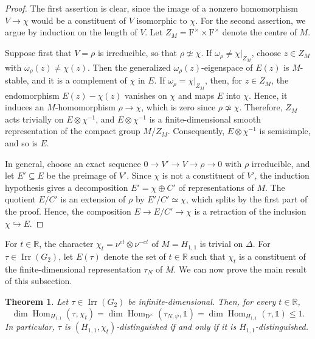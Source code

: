\documentclass[11pt]{amsart}
\numberwithin{equation}{section}
\theoremstyle{plain}
\newtheorem{theorem}{Theorem}[section]
\theoremstyle{definition}
\theoremstyle{remark}
\newcommand{\R}{\mathbb{R}}
\newcommand{\one}{\mathds{1}}
\DeclareMathOperator{\Hom}{Hom}
\DeclareMathOperator{\Irr}{Irr}
\begin{document}
\begin{proof}
	The first assertion is clear, since the image of a nonzero homomorphism $V\to\chi$ would be a constituent of $V$ isomorphic to $\chi$. For the second assertion, we argue by induction on the length of $V$. Let $Z_M=\mathrm{F}^\times\times \mathrm{F}^\times$ denote the centre of $M$.
	
	Suppose first that $V=\rho$ is irreducible, so that $\rho\not\simeq\chi$. If $\omega_\rho\ne\chi|_{Z_M}$, choose $z\in Z_M$ with $\omega_\rho(z)\ne\chi(z)$. Then the generalized $\omega_\rho(z)$-eigenspace of $E(z)$ is $M$-stable, and it is a complement of $\chi$ in $E$. If $\omega_\rho=\chi|_{Z_M}$, then, for $z\in Z_M$, the endomorphism $E(z)-\chi(z)$ vanishes on $\chi$ and maps $E$ into $\chi$. Hence, it induces an $M$-homomorphism $\rho\to\chi$, which is zero since $\rho\not\simeq\chi$. Therefore, $Z_M$ acts trivially on $E\otimes\chi^{-1}$, and $E\otimes\chi^{-1}$ is a finite-dimensional smooth representation of the compact group $M/Z_M$. Consequently, $E\otimes\chi^{-1}$ is semisimple, and so is $E$.
	
	In general, choose an exact sequence $0\to V'\to V\to\rho\to0$ with $\rho$ irreducible, and let $E'\subseteq E$ be the preimage of $V'$. Since $\chi$ is not a constituent of $V'$, the induction hypothesis gives a decomposition $E'=\chi\oplus C'$ of representations of $M$. The quotient $E/C'$ is an extension of $\rho$ by $E'/C'\simeq\chi$, which splits by the first part of the proof. Hence, the composition $E\to E/C'\to\chi$ is a retraction of the inclusion $\chi\hookrightarrow E$.
\end{proof}

For $t\in\R$, the character $\chi_t=\nu^{et}\otimes\nu^{-et}$ of $M=H_{1,1}$ is trivial on $\Delta$. For $\tau\in\Irr(G_2)$, let $E(\tau)$ denote the set of $t\in\R$ such that $\chi_t$ is a constituent of the finite-dimensional representation $\tau_N$ of $M$. We can now prove the main result of this subsection.

\begin{theorem}\label{thm:independence}
	Let $\tau\in\Irr(G_2)$ be infinite-dimensional. Then, for every $t\in\R$,
	$$\dim\Hom_{H_{1,1}}(\tau,\chi_t)=\dim\Hom_{\mathrm{D}^\times}(\tau_{N,\psi},\one)=\dim\Hom_{H_{1,1}}(\tau,\one)\le1.$$
	In particular, $\tau$ is $(H_{1,1},\chi_t)$-distinguished if and only if it is $H_{1,1}$-distinguished.
\end{theorem}
\end{document}
